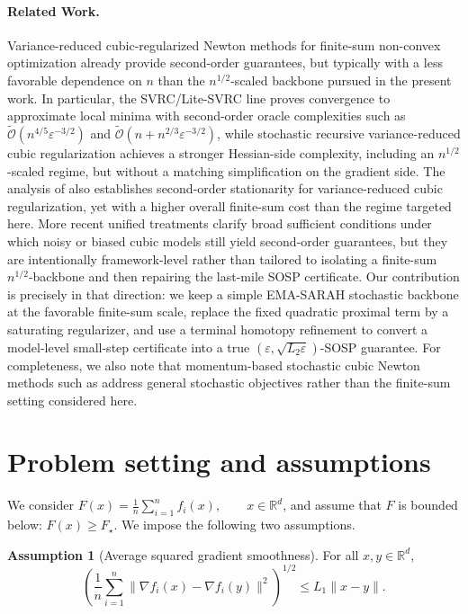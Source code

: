 \documentclass{article}
\theoremstyle{plain}
\theoremstyle{definition}
\newtheorem{assumption}[theorem]{Assumption}
\theoremstyle{remark}
\begin{document}
\paragraph{Related Work.}
Variance-reduced cubic-regularized Newton methods for finite-sum non-convex optimization already provide second-order guarantees, but typically with a less favorable dependence on \(n\) than the \(n^{1/2}\)-scaled backbone pursued in the present work. In particular, the \textsc{SVRC}/Lite-SVRC line \cite{zhou2019stochastic} proves convergence to approximate local minima with second-order oracle complexities such as \(\widetilde{\mathcal O}(n^{4/5}\varepsilon^{-3/2})\) and \(\widetilde{\mathcal O}(n+n^{2/3}\varepsilon^{-3/2})\), while stochastic recursive variance-reduced cubic regularization \cite{zhou2020stochastic} achieves a stronger Hessian-side complexity, including an \(n^{1/2}\)-scaled regime, but without a matching simplification on the gradient side. The analysis of \cite{wang2019stochastic} also establishes second-order stationarity for variance-reduced cubic regularization, yet with a higher overall finite-sum cost than the regime targeted here. More recent unified treatments \cite{chayti2023unified} clarify broad sufficient conditions under which noisy or biased cubic models still yield second-order guarantees, but they are intentionally framework-level rather than tailored to isolating a finite-sum \(n^{1/2}\)-backbone and then repairing the last-mile SOSP certificate. Our contribution is precisely in that direction: we keep a simple EMA-SARAH stochastic backbone at the favorable finite-sum scale, replace the fixed quadratic proximal term by a saturating regularizer, and use a terminal homotopy refinement to convert a model-level small-step certificate into a true \((\varepsilon,\sqrt{L_2\varepsilon})\)-SOSP guarantee. For completeness, we also note that momentum-based stochastic cubic Newton methods such as \cite{yang2025faster} address general stochastic objectives rather than the finite-sum setting considered here.

\section{Problem setting and assumptions}\label{sec:assumptions}

We consider $F(x)=\frac1n\sum_{i=1}^n f_i(x),\qquad x\in\mathbb R^d$,
and assume that \(F\) is bounded below: $F(x)\ge F_\star$. We impose the following two assumptions.

\begin{assumption}[Average squared gradient smoothness]\label{ass:G}
For all \(x,y\in\mathbb R^d\),
\[
\textstyle \left(\frac1n\sum_{i=1}^n \|\nabla f_i(x)-\nabla f_i(y)\|^2\right)^{1/2}
\le L_1\|x-y\|.
\]
\end{assumption}
\end{document}
